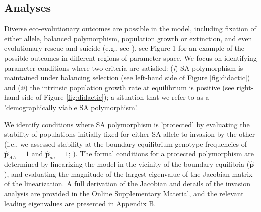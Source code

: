\documentclass[11pt]{article}
\def\mbf#1{\mathbf{#1}}
\begin{document}




\subsection*{Analyses} \label{subsec:analyses}

Diverse eco-evolutionary outcomes are possible in the model, including fixation of either allele, balanced polymorphism, population growth or extinction, and even evolutionary rescue and suicide (e.g., see \citealt{deVriesCaswell2019a,deVriesCaswell2019b}), see Figure 1 for an example of the possible outcomes in different regions of parameter space. We focus on identifying parameter conditions where two criteria are satisfied: ({\itshape i}) SA polymorphism is maintained under balancing selection (see left-hand side of Figure \ref{fig:didactic}) and ({\itshape ii}) the intrinsic population growth rate at equilibrium is positive (see right-hand side of Figure \ref{fig:didactic}); a situation that we refer to as a 'demographically viable SA polymorphism'.

We identify conditions where SA polymorphism is 'protected' by evaluating the stability of populations initially fixed for either SA allele to invasion by the other (i.e., we assessed stability at the boundary equilibrium genotype frequencies of $\hat{\mbf{p}}_{AA} = 1$ and $\hat{\mbf{p}}_{aa} = 1$; \citealt{Levene1953, Prout1968, deVriesCaswell2019b}). The formal conditions for a protected polymorphism are determined by linearizing the model in the vicinity of the boundary equilibria ($\hat{\mbf{p}}$), and evaluating the magnitude of the largest eigenvalue of the Jacobian matrix of the linearization. A full derivation of the Jacobian and details of the invasion analysis are provided in the Online Supplementary Material, and the relevant leading eigenvalues are presented in Appendix B.
\end{document}
